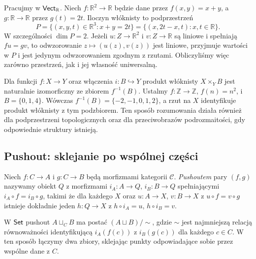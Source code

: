 \begin{przyklad}
Pracujmy w $\mathsf{Vect}_{\mathbb R}$. Niech $f:\mathbb R^2\to\mathbb R$ będzie dane przez $f(x,y)=x+y$, a $g:\mathbb R\to\mathbb R$ przez $g(t)=2t$. Iloczyn włóknisty to podprzestrzeń
\[
P=\{(x,y,t)\in\mathbb R^3:x+y=2t\}=\{(x,2t-x,t):x,t\in\mathbb R\}.
\]
W szczególności $\dim P=2$. Jeżeli $u:Z\to\mathbb R^2$ i $v:Z\to\mathbb R$ są liniowe i spełniają $fu=gv$, to odwzorowanie $z\mapsto(u(z),v(z))$ jest liniowe, przyjmuje wartości w $P$ i jest jedynym odwzorowaniem zgodnym z rzutami. Obliczyliśmy więc zarówno przestrzeń, jak i jej własność uniwersalną.
\end{przyklad}

\begin{przyklad}
Dla funkcji $f:X\to Y$ oraz włączenia $i:B\hookrightarrow Y$ produkt włóknisty $X\times_Y B$ jest naturalnie izomorficzny ze zbiorem $f^{-1}(B)$. Ustalmy $f:\mathbb Z\to\mathbb Z$, $f(n)=n^2$, i $B=\{0,1,4\}$. Wówczas $f^{-1}(B)=\{-2,-1,0,1,2\}$, a rzut na $X$ identyfikuje produkt włóknisty z tym podzbiorem. Ten sposób rozumowania działa również dla podprzestrzeni topologicznych oraz dla przeciwobrazów podrozmaitości, gdy odpowiednie struktury istnieją.
\end{przyklad}


\subsection{Pushout: sklejanie po wspólnej części}

\begin{definicja}[Pushout]\label{def:pushout}
Niech $f:C\to A$ i $g:C\to B$ będą morfizmami kategorii $\mathcal C$. \emph{Pushoutem} pary $(f,g)$ nazywamy obiekt $Q$ z morfizmami $i_A:A\to Q$, $i_B:B\to Q$ spełniającymi $i_A\circ f=i_B\circ g$, takimi że dla każdego $X$ oraz $u:A\to X$, $v:B\to X$ z $u\circ f=v\circ g$ istnieje dokładnie jeden $h:Q\to X$ z $h\circ i_A=u$, $h\circ i_B=v$.
\end{definicja}

\begin{przyklad}
W $\mathsf{Set}$ pushout $A\sqcup_C B$ ma postać $(A\sqcup B)/{\sim}$, gdzie $\sim$ jest najmniejszą relacją równoważności identyfikującą $i_A(f(c))$ z $i_B(g(c))$ dla każdego $c\in C$. W ten sposób łączymy dwa zbiory, sklejając punkty odpowiadające sobie przez wspólne dane z $C$.
\end{przyklad}

